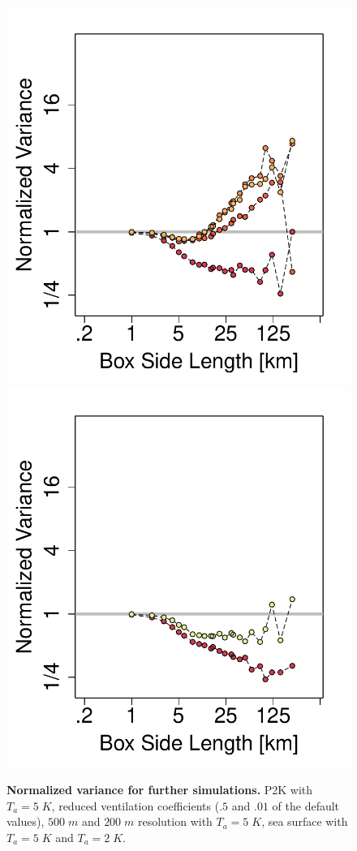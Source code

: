 \documentclass[draft,linenumbers]{agujournal2019}
\begin{document}
\begin{figure}[ht]
\includegraphics[trim={0cm 0cm 0cm 0cm}, clip, height=0.27\linewidth]{var_5K_sea.pdf}
\includegraphics[trim={0cm 0cm 0cm 0cm}, clip, height=0.27\linewidth]{var_2K_sea.pdf}
\caption{{\bf Normalized variance for further simulations.}
P2K with $T_a=5\;K$, reduced ventilation coefficients ($.5$ and $.01$ of the default values), $500\;m$ and $200\;m$ resolution with $T_a=5\;K$, sea surface with $T_a=5\;K$ and $T_a=2\;K$.
}
\label{fig:variance_further_sims}
\end{figure}
\end{document}
